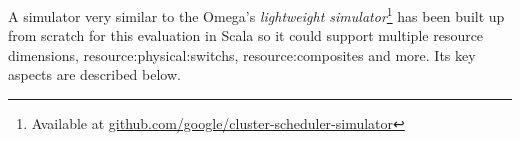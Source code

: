 A simulator very similar to the Omega's \cite{omega} \textit{lightweight simulator}\footnote[2]{\label{omega_simulator} Available at \href{https://github.com/google/cluster-scheduler-simulator}{github.com/google/cluster-scheduler-simulator}} has been built up from scratch for this evaluation in Scala \cite{scala} so it could support multiple resource dimensions, \glspl{resource:physical:switch}, \glspl{resource:composite} and more.
\ifdefined\THESISSUMMARY \else
Its key aspects are described below.
\fi

